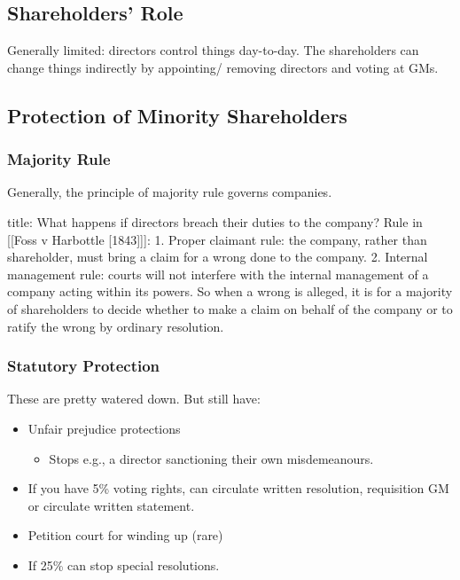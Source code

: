\documentclass[
]{article}
\newenvironment{Shaded}{}{}
\newcommand{\NormalTok}[1]{#1}
\providecommand{\tightlist}{%
  \setlength{\itemsep}{0pt}\setlength{\parskip}{0pt}}
\begin{document}
\hypertarget{shareholders-role}{%
\subsection{Shareholders' Role}\label{shareholders-role}}

Generally limited: directors control things day-to-day. The shareholders
can change things indirectly by appointing/ removing directors and
voting at GMs.

\hypertarget{protection-of-minority-shareholders}{%
\subsection{Protection of Minority
Shareholders}\label{protection-of-minority-shareholders}}

\hypertarget{majority-rule}{%
\subsubsection{Majority Rule}\label{majority-rule}}

Generally, the principle of majority rule governs companies.

\begin{Shaded}
\begin{Highlighting}[]
\NormalTok{title: What happens if directors breach their duties to the company?}
\NormalTok{Rule in [[Foss v Harbottle [1843]]]:}
\NormalTok{1. Proper claimant rule: the company, rather than shareholder, must bring a claim for a wrong done to the company. }
\NormalTok{2. Internal management rule: courts will not interfere with the internal management of a company acting within its powers. So when a wrong is alleged, it is for a majority of shareholders to decide whether to make a claim on behalf of the company or to ratify the wrong by ordinary resolution. }
\end{Highlighting}
\end{Shaded}

\hypertarget{statutory-protection}{%
\subsubsection{Statutory Protection}\label{statutory-protection}}

These are pretty watered down. But still have:

\begin{itemize}
\tightlist
\item
  Unfair prejudice protections

  \begin{itemize}
  \tightlist
  \item
    Stops e.g., a director sanctioning their own misdemeanours.
  \end{itemize}
\item
  If you have 5\% voting rights, can circulate written resolution,
  requisition GM or circulate written statement.
\item
  Petition court for winding up (rare)
\item
  If 25\% can stop special resolutions.
\end{itemize}
\end{document}
